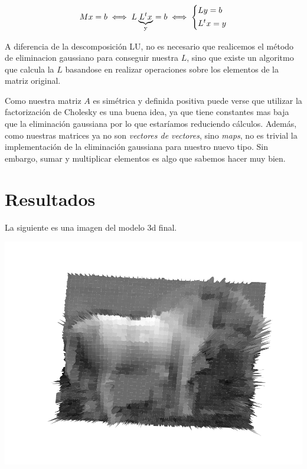 \begin{center}
\[
M x = b \iff L \underbrace{L^t x}_{\text{y}} = b \iff
\begin{dcases}
    L y = b \\
    L^t x = y
\end{dcases}
\]
\end{center}

A diferencia de la descomposición LU, no es necesario que realicemos el método de eliminacion gaussiano para conseguir nuestra $L$, sino que existe un algoritmo que calcula la $L$ basandose en realizar operaciones sobre los elementos de la matriz original.













Como nuestra matriz $A$ es simétrica y definida positiva  puede verse que utilizar la factorización de Cholesky es una buena idea, ya que tiene constantes mas baja que la eliminación gaussiana por lo que estaríamos reduciendo cálculos. Además, como nuestras matrices ya no son \textit{vectores de vectores}, sino \textit{maps},  no es trivial la implementación de la eliminación gaussiana para nuestro nuevo tipo. Sin embargo, sumar y multiplicar elementos es algo que sabemos hacer muy bien. \\




\section{Resultados}

La siguiente es una imagen del modelo 3d final.


{\centering
    \includegraphics[scale=0.7]{informe/imagenes/profundidadesCaballoNormalescatedra.pdf} \\
}
